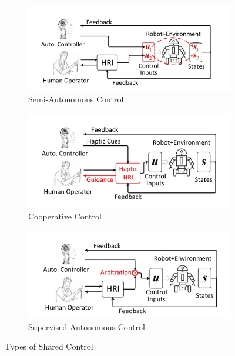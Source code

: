 \begin{figure}[ht]
    \centering
    \begin{subfigure}[a]{0.32\textwidth}
      \includegraphics[width=\textwidth]{Figures/Chapter2/shared_1.png}
      \caption{Semi-Autonomous Control}
      \label{fig:semi_auto_control}
    \end{subfigure}
    \hfill %
    \begin{subfigure}[b]{0.32\textwidth}
      \includegraphics[width=\textwidth]{Figures/Chapter2/shared_2.png}
      \caption{Cooperative Control}
      \label{fig:cooperative_control}
    \end{subfigure}
    \hfill %
    \begin{subfigure}[c]{0.32\textwidth}
      \includegraphics[width=\textwidth]{Figures/Chapter2/shared_3.png}
      \caption{Supervised Autonomous Control}
      \label{fig:supervised_auto_control}
    \end{subfigure}
    \caption{Types of Shared Control}
    \label{fig:shared_control_types}
  \end{figure}
  

